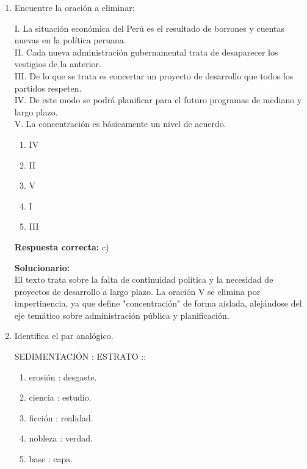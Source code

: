 \begin{enumerate}
	\vspace{6mm}
	
	\item Encuentre la oración a eliminar:
	
	I. La situación económica del Perú es el resultado de borrones y cuentas nuevas en la política peruana. \\
	II. Cada nueva administración gubernamental trata de desaparecer los vestigios de la anterior. \\
	III. De lo que se trata es concertar un proyecto de desarrollo que todos los partidos respeten. \\
	IV. De este modo se podrá planificar para el futuro programas de mediano y largo plazo. \\
	V. La concentración es básicamente un nivel de acuerdo.
	
	\begin{enumerate}[label=\alph*)]
		\item IV
		\item II
		\item V
		\item I
		\item III
	\end{enumerate}
	
	\textbf{Respuesta correcta:} c)
	
	\vspace{2mm}
	\textbf{Solucionario:}\\
	El texto trata sobre la falta de continuidad política y la necesidad de proyectos de desarrollo a largo plazo. La oración V se elimina por impertinencia, ya que define "concentración" de forma aislada, alejándose del eje temático sobre administración pública y planificación.
	
	\vspace{6mm}
	
	\item Identifica el par analógico.
	
	SEDIMENTACIÓN : ESTRATO ::
	
	\begin{enumerate}[label=\alph*)]
		\item erosión : desgaste.
		\item ciencia : estudio.
		\item ficción : realidad.
		\item nobleza : verdad.
		\item base : capa.
	\end{enumerate}
	

\end{enumerate}
